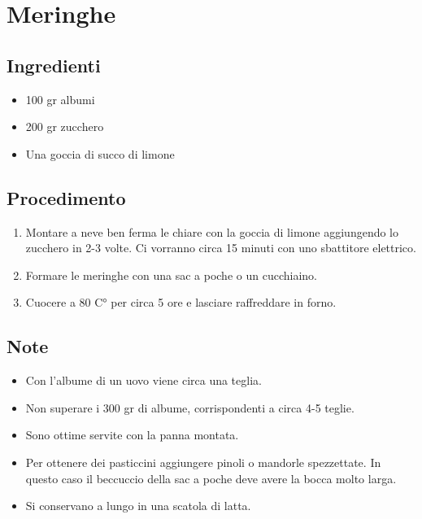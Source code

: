 \section{Meringhe}
\subsection{Ingredienti}
\begin{itemize}
\item 100 gr albumi  
\item 200 gr zucchero   
\item Una goccia di succo di limone
\end{itemize}
\subsection{Procedimento}
\begin{enumerate}
\item  Montare a neve ben ferma le chiare con la goccia di limone aggiungendo lo zucchero in 2-3 volte. Ci vorranno circa 15 minuti con uno sbattitore elettrico.  
\item  Formare le meringhe con una sac a poche o un cucchiaino.  
\item  Cuocere a 80 C° per circa 5 ore e lasciare raffreddare in forno.
\end{enumerate}
\subsection{Note}
\begin{itemize}
\item Con l'albume di un uovo viene circa una teglia.  
\item Non superare i 300 gr di albume, corrispondenti a circa 4-5 teglie.  
\item Sono ottime servite con la panna montata.  
\item Per ottenere dei pasticcini aggiungere pinoli o mandorle spezzettate. In questo caso il beccuccio della sac a poche deve avere la bocca molto larga.  
\item Si conservano a lungo in una scatola di latta.
\end{itemize}
